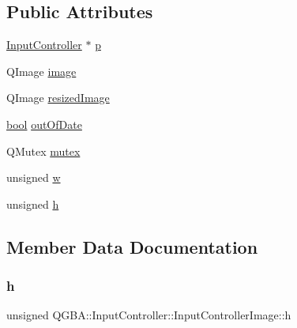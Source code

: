 \subsection*{Public Attributes}
\begin{DoxyCompactItemize}
\item 
\mbox{\hyperlink{class_q_g_b_a_1_1_input_controller}{Input\+Controller}} $\ast$ \mbox{\hyperlink{struct_q_g_b_a_1_1_input_controller_1_1_input_controller_image_ad5140a97769b54aa1078c4321a003022}{p}}
\item 
Q\+Image \mbox{\hyperlink{struct_q_g_b_a_1_1_input_controller_1_1_input_controller_image_a9a387b75c4b0bb58644ea2726678d2be}{image}}
\item 
Q\+Image \mbox{\hyperlink{struct_q_g_b_a_1_1_input_controller_1_1_input_controller_image_a60e22ee349ca4363fd302eb3ea1cdcc3}{resized\+Image}}
\item 
\mbox{\hyperlink{libretro_8h_a4a26dcae73fb7e1528214a068aca317e}{bool}} \mbox{\hyperlink{struct_q_g_b_a_1_1_input_controller_1_1_input_controller_image_a44032712d5886f5ecac591ad19e5997e}{out\+Of\+Date}}
\item 
Q\+Mutex \mbox{\hyperlink{struct_q_g_b_a_1_1_input_controller_1_1_input_controller_image_aac45269d83a50b1b382bac71735b9e66}{mutex}}
\item 
unsigned \mbox{\hyperlink{struct_q_g_b_a_1_1_input_controller_1_1_input_controller_image_a01649bc61eff7d75ec418e0dce5f3088}{w}}
\item 
unsigned \mbox{\hyperlink{struct_q_g_b_a_1_1_input_controller_1_1_input_controller_image_a3047cf10fee5b58037a688dc6023e1c1}{h}}
\end{DoxyCompactItemize}


\subsection{Member Data Documentation}
\mbox{\label{struct_q_g_b_a_1_1_input_controller_1_1_input_controller_image_a3047cf10fee5b58037a688dc6023e1c1}} 
\subsubsection{\texorpdfstring{h}{h}}
{\footnotesize\ttfamily unsigned Q\+G\+B\+A\+::\+Input\+Controller\+::\+Input\+Controller\+Image\+::h}

